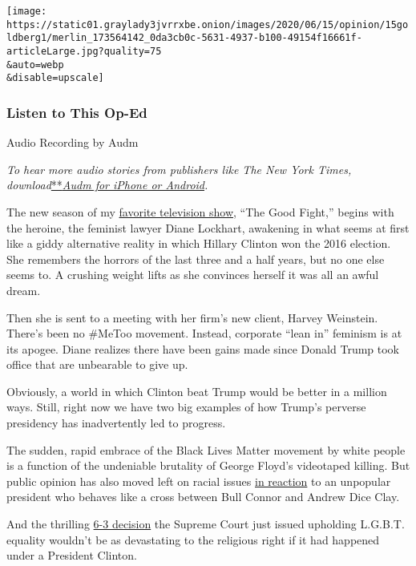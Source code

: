 \texttt{[image: https://static01.graylady3jvrrxbe.onion/images/2020/06/15/opinion/15goldberg1/merlin\_173564142\_0da3cb0c-5631-4937-b100-49154f16661f-articleLarge.jpg?quality=75\\\&auto=webp\\\&disable=upscale]}

\hypertarget{listen-to-this-op-ed}{%
\subsubsection{Listen to This Op-Ed}\label{listen-to-this-op-ed}}

Audio Recording by Audm

\emph{To hear more audio stories from publishers like The New York
Times,
download}\href{https://www.audm.com/?utm_source=nytmag\&utm_medium=embed\&utm_campaign=left_behind_draper}{**}\href{https://www.audm.com/?utm_source=nytopinion\&utm_medium=embed\&utm_campaign=surprise_lgbt_trump}{\emph{Audm
for iPhone or Android}}\emph{.}

The new season of my
\href{https://www.nytimes3xbfgragh.onion/2019/05/03/opinion/the-good-fight-trump.html}{favorite
television show}, ``The Good Fight,'' begins with the heroine, the
feminist lawyer Diane Lockhart, awakening in what seems at first like a
giddy alternative reality in which Hillary Clinton won the 2016
election. She remembers the horrors of the last three and a half years,
but no one else seems to. A crushing weight lifts as she convinces
herself it was all an awful dream.

Then she is sent to a meeting with her firm's new client, Harvey
Weinstein. There's been no \#MeToo movement. Instead, corporate ``lean
in'' feminism is at its apogee. Diane realizes there have been gains
made since Donald Trump took office that are unbearable to give up.

Obviously, a world in which Clinton beat Trump would be better in a
million ways. Still, right now we have two big examples of how Trump's
perverse presidency has inadvertently led to progress.

The sudden, rapid embrace of the Black Lives Matter movement by white
people is a function of the undeniable brutality of George Floyd's
videotaped killing. But public opinion has also moved left on racial
issues
\href{https://www.vox.com/2019/3/22/18259865/great-awokening-white-liberals-race-polling-trump-2020}{in
reaction} to an unpopular president who behaves like a cross between
Bull Connor and Andrew Dice Clay.

And the thrilling
\href{https://www.nytimes3xbfgragh.onion/2020/06/15/us/politics/gorsuch-supreme-court-gay-transgender-rights.html}{6-3
decision} the Supreme Court just issued upholding L.G.B.T. equality
wouldn't be as devastating to the religious right if it had happened
under a President Clinton.

